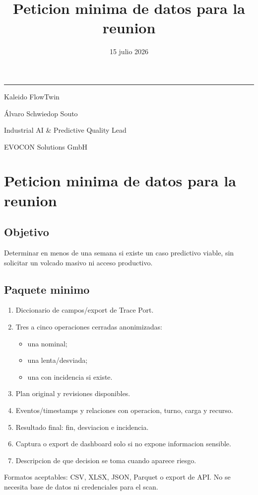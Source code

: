 \documentclass[
  spanish,
  10pt,
  a4paper,
]{article}
\title{Peticion minima de datos para la reunion}
\author{}
\date{15 julio 2026}
\makeatletter
\providecommand{\tightlist}{%
  \setlength{\itemsep}{0pt}\setlength{\parskip}{0pt}}
\renewcommand{\maketitle}{%
  \hypersetup{pageanchor=false}
  \begin{titlepage}
    \pagecolor{KaleidoNavy}
    \color{white}
    \vspace*{1.4cm}
    {\color{KaleidoCyan}\rule{2.4cm}{2.5pt}\par}
    \vspace{1.1cm}
    {\Huge\bfseries\@title\par}
    \vspace{0.65cm}
    {\Large\color{KaleidoMint}Kaleido FlowTwin\par}
    \vfill
    {\large Álvaro Schwiedop Souto\par}
    \vspace{0.15cm}
    {\normalsize\color{KaleidoMint}Industrial AI \& Predictive Quality Lead\par}
    \vspace{0.15cm}
    {\normalsize\color{KaleidoMint}EVOCON Solutions GmbH\par}
    \vspace{0.25cm}
    {\normalsize\color{KaleidoMint}\@date\par}
  \end{titlepage}
  \hypersetup{pageanchor=true}
  \nopagecolor
  \color{black}
}
\makeatother
\begin{document}
\maketitle

{
\setcounter{tocdepth}{3}
\tableofcontents
}
\section{Peticion minima de datos para la
reunion}\label{peticion-minima-de-datos-para-la-reunion}

\subsection{Objetivo}\label{objetivo}

Determinar en menos de una semana si existe un caso predictivo viable,
sin solicitar un volcado masivo ni acceso productivo.

\subsection{Paquete minimo}\label{paquete-minimo}

\begin{enumerate}
\def\labelenumi{\arabic{enumi}.}
\tightlist
\item
  Diccionario de campos/export de Trace Port.
\item
  Tres a cinco operaciones cerradas anonimizadas:

  \begin{itemize}
  \tightlist
  \item
    una nominal;
  \item
    una lenta/desviada;
  \item
    una con incidencia si existe.
  \end{itemize}
\item
  Plan original y revisiones disponibles.
\item
  Eventos/timestamps y relaciones con operacion, turno, carga y recurso.
\item
  Resultado final: fin, desviacion e incidencia.
\item
  Captura o export de dashboard solo si no expone informacion sensible.
\item
  Descripcion de que decision se toma cuando aparece riesgo.
\end{enumerate}

Formatos aceptables: CSV, XLSX, JSON, Parquet o export de API. No se
necesita base de datos ni credenciales para el scan.
\end{document}
